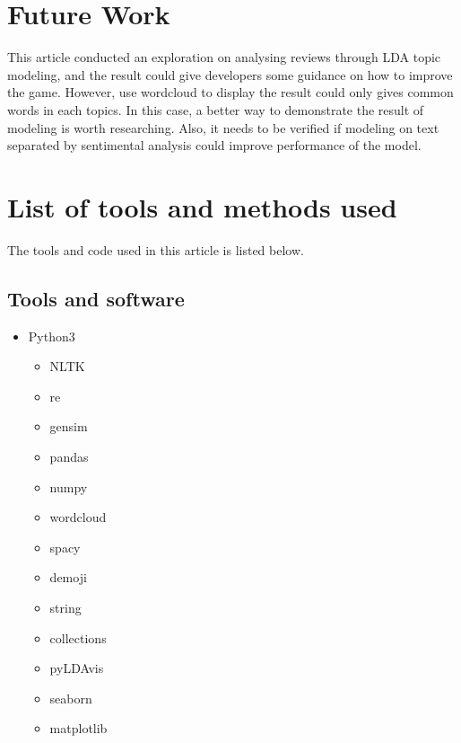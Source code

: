 \documentclass[12pt]{article}
\begin{document}
\section{Future Work}
\label{future}
This article conducted an exploration on analysing reviews through LDA topic modeling, and the result could give developers some guidance on how to improve the game. However, use wordcloud to display the result could only gives common words in each topics. In this case, a better way to demonstrate the result of modeling is worth researching. Also, it needs to be verified if modeling on text separated by sentimental analysis could improve performance of the model. 
\section{List of tools and methods used}
The tools and code used in this article is listed below.
\subsection{Tools and software}
\begin{itemize}
\item Python3
\begin{itemize}
\item NLTK
\item re
\item gensim
\item pandas
\item numpy
\item wordcloud
\item spacy
\item demoji
\item string
\item collections
\item pyLDAvis
\item seaborn
\item matplotlib
\end{itemize}
\end{itemize}
\end{document}
